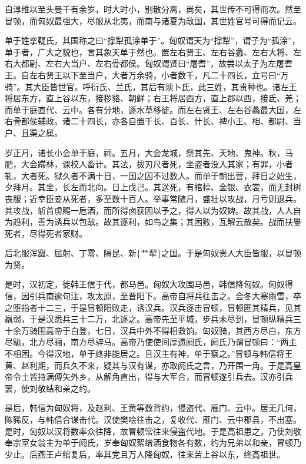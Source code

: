 \documentclass[]{article}
\begin{document}
自淳维以至头曼千有余岁，时大时小，别散分离，尚矣，其世传不可得而次。然至冒顿，而匈奴最强大，尽服从北夷，而南与诸夏为敌国，其世姓官号可得而记云。

单于姓挛鞮氏，其国称之曰``撑犁孤涂单于''。匈奴谓天为``撑犁''，谓子为``孤涂''，单于者，广大之貌也，言其象天单于然也。置左右贤王、左右谷蠡、左右大将、左右大都尉、左右大当户、左右骨都侯。匈奴谓贤曰``屠耆''，故尝以太子为左屠耆王。自左右贤王以下至当户，大者万余骑，小者数千，凡二十四长，立号曰``万骑''。其大臣皆世官。呼衍氏、兰氏，其后有须卜氏，此三姓，其贵种也。诸左王将居东方，直上谷以东，接秽貉、朝鲜；右王将居西方，直上郡以西，接氐、羌；而单于庭直代、云中。各有分地，逐水草移徙。而左右贤王、左右谷蠡最大国，左右骨都侯辅政。诸二十四长，亦各自置千长、百长、什长、裨小王、相、都尉、当户、且渠之属。

岁正月，诸长小会单于庭，祠。五月，大会龙城，祭其先、天地、鬼神。秋，马肥，大会蹛林，课校人畜计。其法，拔刃尺者死，坐盗者没入其家；有罪，小者轧，大者死。狱久者不满十日，一国之囚不过数人。而单于朝出营，拜日之始生，夕拜月。其坐，长左而北向。日上戊己。其送死，有棺椁、金银、衣裳，而无封树丧服；近幸臣妾从死者，多至数十百人。举事常随月，盛壮以攻战，月亏则退兵。其攻战，斩首虏赐一卮酒，而所得卤获因以予之，得人以为奴婢。故其战，人人自为趋利，善为诱兵以包敌。故其逐利，如鸟之集；其困败，瓦解云散矣。战而扶轝死者，尽得死者家财。

后北服浑窳、屈射、丁零、隔昆、新\{艹犁\}之国。于是匈奴贵人大臣皆服，以冒顿为贤。

是时，汉初定，徙韩王信于代，都马邑。匈奴大攻围马邑，韩信降匈奴。匈奴得信，因引兵南逾句注，攻太原，至晋阳下。高帝自将兵往击之。会冬大寒雨雪，卒之堕指者十二三，于是冒顿阳败走，诱汉兵。汉兵逐击冒顿，冒顿匿其精兵，见其羸弱，于是汉悉兵三十二万，北逐之。高帝先至平城，步兵未尽到，冒顿纵精兵三十余万骑围高帝于白登，七日，汉兵中外不得相救饷。匈奴骑，其西方尽白，东方尽駹，北方尽骊，南方尽骍马。高帝乃使使间厚遗阏氏，阏氏乃谓冒顿曰：``两主不相困。今得汉地，单于终非能居之。且汉主有神，单于察之。''冒顿与韩信将王黄、赵利期，而兵久不来，疑其与汉有谋，亦取阏氏之言，乃开围一角。于是高皇帝令士皆持满傅矢外乡，从解角直出，得与大军合，而冒顿遂引兵去。汉亦引兵罢，使刘敬结和亲之约。

是后，韩信为匈奴将，及赵利、王黄等数背约，侵盗代、雁门、云中。居无几何，陈豨反，与韩信合谋击代。汉使樊哙往击之，复收代、雁门、云中郡县，不出塞。是时，匈奴以汉将数率众往降，故冒顿常往来侵盗代地。于是高祖患之，乃使刘敬奉宗室女翁主为单于阏氏，岁奉匈奴絮缯酒食物各有数，约为兄弟以和亲，冒顿乃少止。后燕王卢绾复后，率其党且万人降匈奴，往来苦上谷以东，终高祖世。
\end{document}
